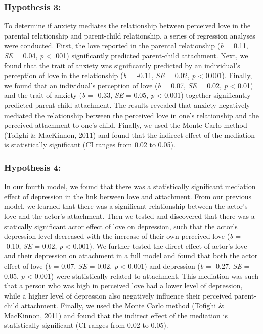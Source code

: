\documentclass[man]{apa6}
\begin{document}
\hypertarget{hypothesis-3}{%
\subsubsection{Hypothesis 3:}\label{hypothesis-3}}

To determine if anxiety mediates the relationship between perceived love in the parental relationship and parent-child relationship, a series of regression analyses were conducted. First, the love reported in the parental relationship (\emph{b} = 0.11, \emph{SE }= 0.04, \emph{p} \textless{} .001) significantly predicted parent-child attachment. Next, we found that the trait of anxiety was significantly predicted by an individual's perception of love in the relationship (\emph{b} = -0.11, \emph{SE} = 0.02, \emph{p} \textless{} 0.001). Finally, we found that an individual's perception of love (\emph{b} = 0.07, \emph{SE} = 0.02, \emph{p} \textless{} 0.01) and the trait of anxiety (\emph{b} = -0.33, \emph{SE} = 0.05, \emph{p} \textless{} 0.001) together significantly predicted parent-child attachment. The results revealed that anxiety negatively mediated the relationship between the perceived love in one's relationship and the perceived attachment to one's child. Finally, we used the Monte Carlo method (Tofighi \& MacKinnon, 2011) and found that the indirect effect of the mediation is statistically significant (CI ranges from 0.02 to 0.05).

\hypertarget{hypothesis-4}{%
\subsubsection{Hypothesis 4:}\label{hypothesis-4}}

In our fourth model, we found that there was a statistically significant mediation effect of depression in the link between love and attachment. From our previous model, we learned that there was a significant relationship between the actor's love and the actor's attachment. Then we tested and discovered that there was a statically significant actor effect of love on depression, such that the actor's depression level decreased with the increase of their own perceived love (\emph{b} = -0.10, \emph{SE} = 0.02, \emph{p} \textless{} 0.001). We further tested the direct effect of actor's love and their depression on attachment in a full model and found that both the actor effect of love (\emph{b} = 0.07, \emph{SE} = 0.02, \emph{p} \textless{} 0.001) and depression (\emph{b} = -0.27, \emph{SE} = 0.05, \emph{p} \textless{} 0.001) were statistically related to attachment. This mediation was such that a person who was high in perceived love had a lower level of depression, while a higher level of depression also negatively influence their perceived parent-child attachment. Finally, we used the Monte Carlo method (Tofighi \& MacKinnon, 2011) and found that the indirect effect of the mediation is statistically significant (CI ranges from 0.02 to 0.05).
\end{document}
